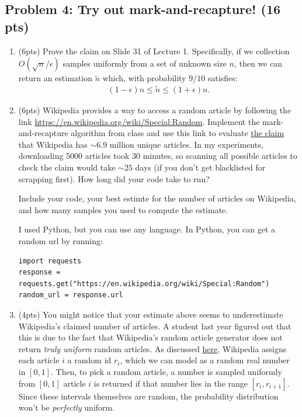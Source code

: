 \documentclass[10pt]{article}
\begin{document}
\subsection{Problem 4: Try out mark-and-recapture! (16 pts)}
\begin{enumerate}
	\item (6pts) Prove the claim on Slide 31 of Lecture 1. Specifically, if we collection $O(\sqrt{n}/\epsilon)$ samples uniformly from a set of unknown size $n$, then we can return an estimation $\tilde{n}$ which, with probability $9/10$ satisfies:
	\begin{align*}
		(1-\epsilon)n \leq \tilde{n} \leq (1+\epsilon)n.
	\end{align*}
	
	\item (6pts) Wikipedia provides a way to access a random article by following the link \url{https://en.wikipedia.org/wiki/Special:Random}. Implement the mark-and-recapture algorithm from class and use this link to evaluate \href{https://en.wikipedia.org/wiki/Wikipedia:Size_of_Wikipedia}{the claim} that Wikipedia has $\sim 6.9$ million unique articles. In my experiments, downloading 5000 articles took 30 minutes, so scanning all possible articles to check the claim would take $\sim 25$ days (if you don't get blacklisted for scrapping first). How long did your code take to run?
	
	Include your code, your best estimte for the number of articles on Wikipedia, and how many samples you used to compute the estimate. 
	
	 I  used Python, but you can use any language. In Python, you can get a random url by running:
\begin{verbatim}
import requests
response = requests.get("https://en.wikipedia.org/wiki/Special:Random")
random_url = response.url	
\end{verbatim}

\item (4pts) You might notice that your estimate above seems to underestimate Wikipedia's claimed number of articles. A student last year figured out that this is due to the fact that 
Wikipedia's random article generator does not return \emph{truly uniform} random articles. As discussed \href{https://en.wikipedia.org/wiki/Wikipedia:FAQ/Technical#random}{here}, Wikipedia assigns each article $i$ a random id $r_i$, which we can model as a random real number in $[0, 1]$. Then, to pick a random article, a number is sampled uniformly from $[0, 1]$ article $i$ is returned if that number lies in the range $[r_i, r_{i+1}]$. Since these intervals themselves are random, the probability distribution won't be \emph{perfectly} uniform.\\


\end{enumerate}
\end{document}
